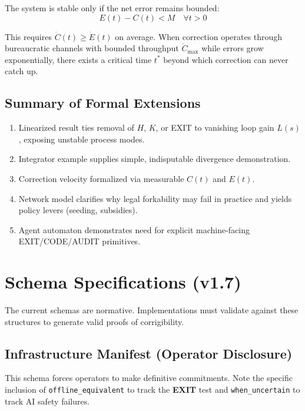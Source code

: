 The system is stable only if the net error remains bounded:
\begin{equation}
E(t) - C(t) < M \quad \forall t > 0
\end{equation}

This requires $\dot{C}(t) \geq \dot{E}(t)$ on average. When correction operates through bureaucratic channels with bounded throughput $\dot{C}_{\max}$ while errors grow exponentially, there exists a critical time $t^*$ beyond which correction can never catch up.

\subsection{Summary of Formal Extensions}

\begin{enumerate}
    \item Linearized result ties removal of $H$, $K$, or EXIT to vanishing loop gain $L(s)$, exposing unstable process modes.
    \item Integrator example supplies simple, indisputable divergence demonstration.
    \item Correction velocity formalized via measurable $C(t)$ and $E(t)$.
    \item Network model clarifies why legal forkability may fail in practice and yields policy levers (seeding, subsidies).
    \item Agent automaton demonstrates need for explicit machine-facing EXIT/CODE/AUDIT primitives.
\end{enumerate}

\section{Schema Specifications (v1.7)}
\label{appendix:schema}

The current schemas are normative. Implementations must validate against these structures to generate valid proofs of corrigibility.

\subsection{Infrastructure Manifest (Operator Disclosure)}

This schema forces operators to make definitive commitments. Note the specific inclusion of \texttt{offline\_equivalent} to track the \textbf{EXIT} test and \texttt{when\_uncertain} to track AI safety failures.

